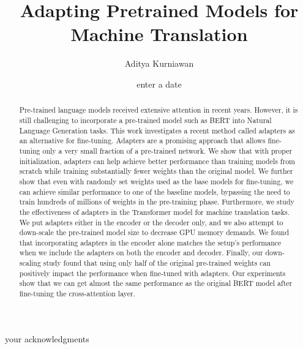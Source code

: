 \documentclass[12pt, a4paper]{report}
\theoremstyle{definition}
\theoremstyle{definition}%
\theoremstyle{definition}%
\theoremstyle{definition}%
\theoremstyle{definition}%
\theoremstyle{definition}%
\begin{document}
\title{Adapting Pretrained Models for Machine Translation}
\author{Aditya Kurniawan}
\date{enter a date}

\frontmatter


\begin{acknowledgements}
    your acknowledgments
\end{acknowledgements}

\begin{abstract}
    Pre-trained language models received extensive attention in recent years. However, it is still challenging to incorporate a pre-trained model such as BERT into Natural Language Generation tasks. This work investigates a recent method called adapters as an alternative for fine-tuning. Adapters are a promising approach that allows fine-tuning only a very small fraction of a pre-trained network.
    We show that with proper initialization, adapters can help achieve better performance than training models from scratch while training substantially fewer weights than the original model.
    We further show that even with randomly set weights used as the base models for fine-tuning, we can achieve similar performance to one of the baseline models, bypassing the need to train hundreds of millions of weights in the pre-training phase.
    Furthermore, we study the effectiveness of adapters in the Transformer model for machine translation tasks. We put adapters either in the encoder or the decoder only, and we also attempt to down-scale the pre-trained model size to decrease GPU memory demands.
    We found that incorporating adapters in the encoder alone matches the setup's performance when we include the adapters on both the encoder and decoder.
    Finally, our down-scaling study found that using only half of the original pre-trained weights can positively impact the performance when fine-tuned with adapters. Our experiments show that we can get almost the same performance as the original BERT model after fine-tuning the cross-attention layer.
\end{abstract}

\tableofcontents

\listoffigures

\listoftables



\mainmatter

\end{document}
